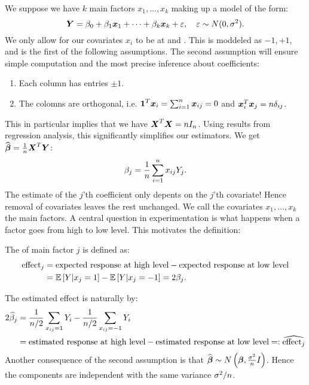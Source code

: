 We suppose we have $k$ main factors $x_1,\dots,x_k$ making up a model of the form:
$$
    \boldsymbol{Y}=\beta_0 + \beta_1\boldsymbol{x}_1+\dots+\beta_k\boldsymbol{x}_k + \varepsilon, \quad \varepsilon\sim N(0, \sigma^2).
$$ 
We only allow for our covariates $x_i$ to be at  and . This is moddeled as $-1, +1$, and is the first of the following assumptions. The second assumption will ensure simple computation and the most precise inference about coefficients:
\begin{enumerate}
    \item Each column has entries $\pm 1$.
    \item The colomns are orthogonal, i.e. $\boldsymbol{1}^T\boldsymbol{x}_i=\sum_{i=1}^n \boldsymbol{x}_{ij}=0$ and $\boldsymbol{x}_i^T \boldsymbol{x}_j=n\delta_{ij}$. 
\end{enumerate}
This in particular implies that we have $\boldsymbol{X}^T \boldsymbol{X} = n I_n$. Using results from regression analysis, this significantly simplifies our estimators. We get $\widehat{\boldsymbol{\beta}}=\frac{1}{n} \boldsymbol{X}^T\boldsymbol{Y}$:
\begin{equation*}
    \beta_j = \frac{1}{n} \sum_{i=1}^n x_{ij} Y_j.
\end{equation*}
The estimate of the $j$'th coefficient only depents on the $j$'th covariate! Hence removal of covariates leaves the rest unchanged. We call the covariates $x_1,\dots, x_k$ the main factors. A central question in experimentation is what happens when a factor goes from high to low level. This motivates the definition:
\begin{definition}
    The  of main factor $j$ is defined as:
    \begin{align*}
        \textrm{effect}_j 
        &= \textrm{expected response at high level} - \textrm{expected response at low level} 
        \\&= \mathbb{E}\left[Y | x_{j} = 1\right] - \mathbb{E}\left[Y | x_{j} = -1\right]
        = 2\beta_j.        
    \end{align*}
\end{definition}
The estimated effect is naturally by:
\begin{align*}
    2\widehat{\beta}_j 
    &= \frac{1}{n/2} \sum_{x_{ij} = 1} Y_i - \frac{1}{n/2} \sum_{x_{ij} = - 1} Y_i  
    \\&= \textrm{estimated response at high level} - \textrm{estimated response at low level} 
    =: \widehat{\textrm{effect}_j}
\end{align*}
Another consequence of the second assumption is that $\widehat{\boldsymbol{\beta}} \sim N\left( \boldsymbol{\beta}, \frac{\sigma^2}{n}I \right)$. Hence the components are independent with the same variance $\sigma^2/n$. 

